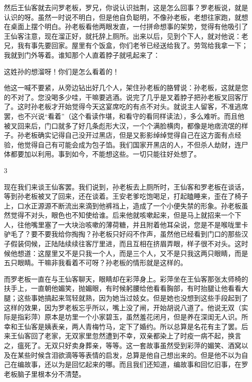 然后王仙客就去问罗老板，罗兄，你说认识拙荆，这是怎么回事？罗老板说，就是认识的呀。虽然一时说不明白，但是他自负聪明，不像孙老板，老想往家跑，就想在桌面上摆个明白。孙老板看他两眼发直，一付拼命想事的架势，觉得有他吸引了王仙客注意，现在溜正好，就托辞上厕所。出来以后，见到个下人，就对他说：老兄，我有事先要回家。屋里有个饭盒，你们老爷已经送给我了。劳驾给我拿一下；我就到门外等着。谁知那个人直着脖子就吼起来了： 

这姓孙的想溜呀！你们是怎么看着的！ 

他这一喊不要紧，从旁边钻出好几个人，架住孙老板的胳臂说：孙老板，这就是您的不对了。您没喝多少哇，干嘛要逃酒。说完了几乎是叉着脖子把孙老板叉回客厅了。这时孙老板才开始觉得今天这宴席吃的有点不对头。就说主人留客，不准逃席罢，也不兴说“看着”（这个看读作堪，和看守的看同样读法），多么难听。而且他被叉回来后，门口就多了好几条彪形大汉，一个个满脸横肉，都像是地痞流氓的样子。孙老板确实记得自己没开过黑店，但是又影影绰绰觉得自己在这方面有点经验，他觉得自己有可能会成为包子馅。我们国家开黑店的人，不但杀人劫财，连尸体都要加以利用。事到如今，不能想这些。一切只能往好处想了。 

3 

现在我们来谈王仙客罢。我们说到，孙老板去上厕所时，王仙客和罗老板在谈话，等到孙老板被叉了回来，还在谈着。王安老爹吃饱喝足，打起瞌睡来，歪在了椅子上，口水正源源不断流出来滴到他裤裆上，造成了一个小便失禁的形象。孙老板虽然觉得不对头，眼色也不知使给谁。后来他就咳嗽起来，但是马上就招来一个下人，往他嘴里塞了一大块治咳嗽的薄荷糖，并且附着他耳朵说，您是不是喉咙里卡驴毛了？要不要我给你掏掏？孙老板只好闷不作声，虽然他已经看到门口的那些汉子假装伺候，正陆陆续续往客厅里进，而且互相在挤眉弄眼，样子很不对头。这时候他想道：这屋里又不是只我一个人，而是三个人，又不是只我这两只眼睛，而是五只眼睛。干嘛非我看着不可呀？孙老板的情形就是这样的。 

而罗老板一直在与王仙客聊天，眼睛却在彩萍身上。彩萍坐在王仙客那张太师椅的扶手上，一直朝他媚笑，抛媚眼，有时候躬腰给他看看胸部，有时抬腿让他看看大腿；这些事她搞起来驾轻就熟，因为她当过妓女。但是她也没想到这些手段起到了这样的效果，因为罗老板忘乎所以，嘴上没了闸，开始胡说八道了。他说无双（实际是指彩萍）原本是坊里一个小家碧玉，虽然羞花闭月，但是养在深闺无人识。所幸和王仙客是姨表亲，两人青梅竹马，定下了婚约。所以总算是名花有主了罢。后来王仙客回了老家，无双家里忽然遭到不幸，双亲都染上了时疫一病不起，换言之，瘟死了。无双只好卖身葬亲，等等。这一套故事虽然受到彩萍的媚笑、酒窝以及在某些时候含泪欲滴等等表情的启发，总算是他自己想出来的。但是他不以为自己在编故事，还以为是回忆起来的哪。而且我们还知道，编故事和回忆旧事，在罗老板脑子里根本分不清楚。 

